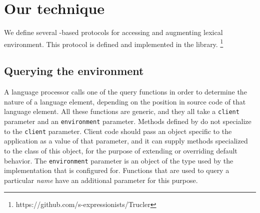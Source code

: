 \section{Our technique}

We define several \clos{}-based protocols for accessing and augmenting
lexical environment.  This protocol is defined and implemented in the
\trucler{} library.%
\footnote{https://github.com/s-expressionists/Trucler}

\subsection{Querying the environment}

A language processor calls one of the query functions in order to
determine the nature of a language element, depending on the position
in source code of that language element.  All these functions are
generic, and they all take a \texttt{client} parameter and an
\texttt{environment} parameter.  Methods defined by \trucler{} do not
specialize to the \texttt{client} parameter.  Client code should pass
an object specific to the application as a value of that parameter,
and it can supply methods specialized to the class of this object, for
the purpose of extending or overriding default behavior.  The
\texttt{environment} parameter is an object of the type used by the
implementation that \trucler{} is configured for.  Functions that are
used to query a particular \emph{name} have an additional parameter
for this purpose.

